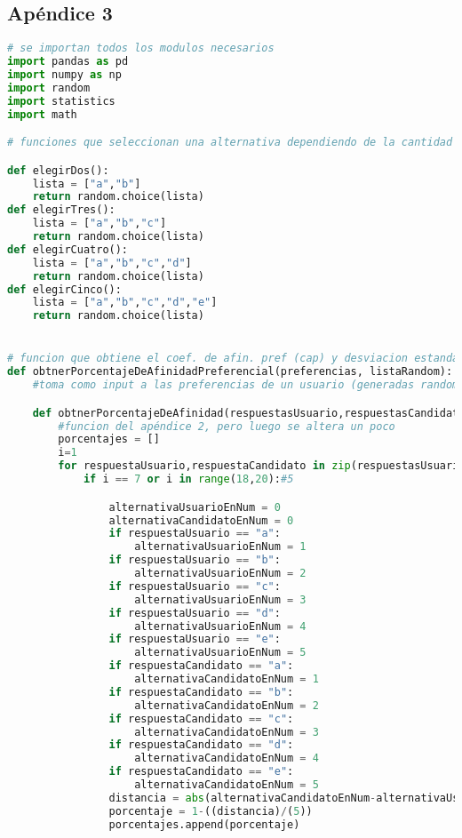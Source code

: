 \documentclass[a4paper]{article}
\begin{document}
\subsection{Apéndice 3}
\begin{lstlisting}[language=Python]
# se importan todos los modulos necesarios
import pandas as pd
import numpy as np
import random
import statistics
import math

# funciones que seleccionan una alternativa dependiendo de la cantidad de ellas por pregunta

def elegirDos():
    lista = ["a","b"]
    return random.choice(lista)
def elegirTres():
    lista = ["a","b","c"]
    return random.choice(lista)
def elegirCuatro():
    lista = ["a","b","c","d"]
    return random.choice(lista)
def elegirCinco():
    lista = ["a","b","c","d","e"]
    return random.choice(lista)


# funcion que obtiene el coef. de afin. pref (cap) y desviacion estandar .
def obtnerPorcentajeDeAfinidadPreferencial(preferencias, listaRandom):
    #toma como input a las preferencias de un usuario (generadas random) y una lista de respuestas

    def obtnerPorcentajeDeAfinidad(respuestasUsuario,respuestasCandidato, preferencias):
        #funcion del apéndice 2, pero luego se altera un poco
        porcentajes = []
        i=1
        for respuestaUsuario,respuestaCandidato in zip(respuestasUsuario,respuestasCandidato):
            if i == 7 or i in range(18,20):#5

                alternativaUsuarioEnNum = 0
                alternativaCandidatoEnNum = 0
                if respuestaUsuario == "a":
                    alternativaUsuarioEnNum = 1
                if respuestaUsuario == "b":
                    alternativaUsuarioEnNum = 2
                if respuestaUsuario == "c":
                    alternativaUsuarioEnNum = 3
                if respuestaUsuario == "d":
                    alternativaUsuarioEnNum = 4
                if respuestaUsuario == "e":
                    alternativaUsuarioEnNum = 5
                if respuestaCandidato == "a":
                    alternativaCandidatoEnNum = 1
                if respuestaCandidato == "b":
                    alternativaCandidatoEnNum = 2
                if respuestaCandidato == "c":
                    alternativaCandidatoEnNum = 3
                if respuestaCandidato == "d":
                    alternativaCandidatoEnNum = 4
                if respuestaCandidato == "e":
                    alternativaCandidatoEnNum = 5
                distancia = abs(alternativaCandidatoEnNum-alternativaUsuarioEnNum)
                porcentaje = 1-((distancia)/(5))
                porcentajes.append(porcentaje)


\end{lstlisting}
\end{document}
